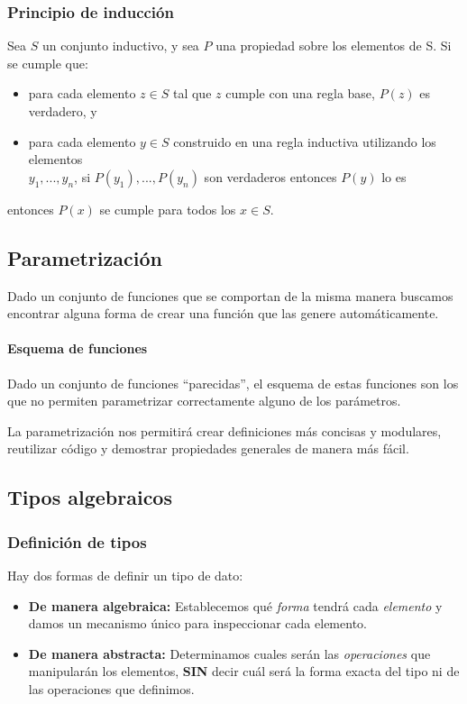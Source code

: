 \subsubsection{Principio de inducción}
Sea $S$ un conjunto inductivo, y sea $P$ una propiedad sobre los elementos de S. Si se cumple que:
\begin{itemize}
	\item para cada elemento $z\in S$ tal que $z$ cumple con una regla base, $P(z)$ es verdadero, y
	\item para cada elemento $y\in S$ construido en una regla inductiva utilizando los elementos \\ $y_1, ..., y_n$, si $P(y_1 ), ..., P(y_n)$ son verdaderos entonces $P(y)$ lo es
	
\end{itemize}

entonces $P(x)$ se cumple para todos los $x\in S$.

\subsection{Parametrización}
Dado un conjunto de funciones que se comportan de la misma manera buscamos encontrar alguna forma de crear una función que las genere automáticamente. 

\paragraph{Esquema de funciones} Dado un conjunto de funciones ``parecidas'', el esquema de estas funciones son los que no permiten parametrizar correctamente alguno de los parámetros.

La parametrización nos permitirá crear definiciones más concisas y modulares, reutilizar código y demostrar propiedades generales de manera más fácil.

\subsection{Tipos algebraicos}

\subsubsection{Definición de tipos}
Hay dos formas de definir un tipo de dato:
\begin{itemize}
	\item \textbf{De manera algebraica:} Establecemos qué \textit{forma} tendrá cada \textit{elemento} y damos un mecanismo único para inspeccionar cada elemento.
	\item \textbf{De manera abstracta:} Determinamos cuales serán las \textit{operaciones} que manipularán los elementos, \textbf{SIN} decir cuál será la forma exacta del tipo ni de las operaciones que definimos.
\end{itemize}

